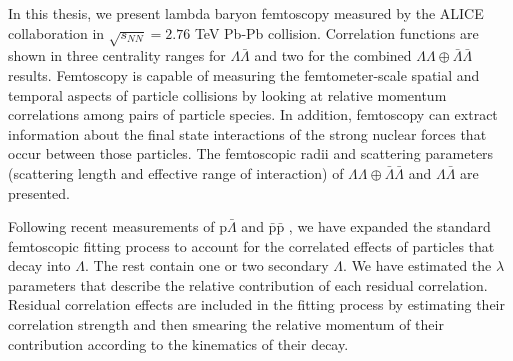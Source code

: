 In this thesis, we present lambda baryon femtoscopy measured by the ALICE collaboration in $\sqrt{s_{NN}}=2.76$ TeV Pb-Pb collision.
Correlation functions are shown in three centrality ranges for $\Lambda\bar{\Lambda}$ and two for the combined $\Lambda\Lambda\oplus\bar{\Lambda}\bar{\Lambda}$ results.
Femtoscopy is capable of measuring the femtometer-scale spatial and temporal aspects of particle collisions by looking at relative momentum correlations among pairs of particle species.
In addition, femtoscopy can extract information about the final state interactions of the strong nuclear forces that occur between those particles.
The femtoscopic radii and scattering parameters (scattering length and effective range of interaction) of $\Lambda\Lambda\oplus\bar{\Lambda}\bar{\Lambda}$ and $\Lambda\bar{\Lambda}$ are presented.

Following recent measurements of $\mathrm{p}\bar{\Lambda}$ and $\bar{\mathrm{p}}\bar{\mathrm{p}}$ , we have expanded the standard femtoscopic fitting process to account for the correlated effects of particles that decay into $\Lambda$. %
The rest contain one or two secondary $\Lambda$.
We have estimated the $\lambda$ parameters that describe the relative contribution of each residual correlation.
Residual correlation effects are included in the fitting process by estimating their correlation strength and then smearing the relative momentum of their contribution according to the kinematics of their decay.

